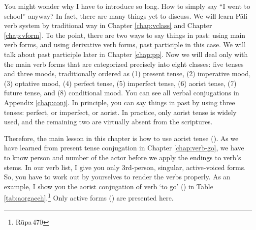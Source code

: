 You might wonder why I have to introduce so long. How to simply say ``I went to school'' anyway? In fact, there are many things yet to discuss. We will learn P\=ali verb system by traditional way in Chapter \ref{chap:vclass} and Chapter \ref{chap:vform}. To the point, there are two ways to say things in past: using main verb forms, and using derivative verb forms, past participle in this case. We will talk about past participle later in Chapter \ref{chap:pp}. Now we will deal only with the main verb forms that are categorized precisely into eight classes: five tenses and three moods, traditionally ordered as (1) present tense, (2) imperative mood, (3) optative mood, (4) perfect tense, (5) imperfect tense, (6) aorist tense, (7) future tense, and (8) conditional mood. You can see all verbal conjugations in Appendix \ref{chap:conj}. In principle, you can say things in past by using three tenses: perfect, or imperfect, or aorist. In practice, only aorist tense is widely used, and the remaining two are virtually absent from the scriptures.

Therefore, the main lesson in this chapter is how to use aorist tense (). As we have learned from present tense conjugation in Chapter \ref{chap:verb-go}, we have to know person and number of the actor before we apply the endings to verb's stems. In our verb list, I give you only 3rd-person, singular, active-voiced forms. So, you have to work out by yourselves to render the verbs properly. As an example, I show you the aorist conjugation of verb `to go' () in Table \ref{tab:aorgacch}.\footnote{R\=upa\,470} Only active forms () are presented here.

